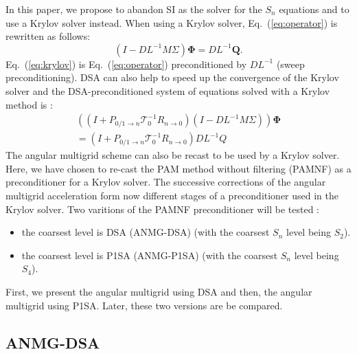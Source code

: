 \documentclass[preprint,10pt]{elsarticle}
\newcommand\bs{\boldsymbol}
\renewcommand{\(}{\left(}
\renewcommand{\)}{\right)}
\renewcommand{\[}{\left[}
\renewcommand{\]}{\right]}
\newcommand{\eqt}[1]{Eq.~(\ref{#1})}                     %
\begin{document}
In this paper, we propose to abandon SI as the solver for the $S_n$ equations 
and to use a Krylov solver instead. When using a Krylov solver, \eqt{eq:operator} is rewritten as follows:
%
\begin{equation}
(I-DL^{-1}M\Sigma) \bs{\Phi} = DL^{-1}\bs{Q} .
\label{eq:krylov}
\end{equation}
\eqt{eq:krylov} is \eqt{eq:operator}
%
preconditioned by $DL^{-1}$ (sweep preconditioning). 
DSA can also 
help to speed up the convergence of the Krylov solver and the DSA-preconditioned system of equations 
solved with a Krylov method is :
%
\begin{multline}
\((I+P_{0/1 \rightarrow n}\mathcal{T}_0^{-1} R_{n\rightarrow 0})(I-DL^{-1}M\Sigma)\)
\bs{\Phi} \\ = (I+P_{0/1 \rightarrow n}\mathcal{T}_0^{-1} R_{n\rightarrow 0})DL^{-1}Q
\end{multline}       
%
The angular multigrid scheme can also be recast to be used by a Krylov solver. Here, we have chosen
to re-cast the PAM method without filtering (PAMNF) as a preconditioner for a Krylov solver.
The successive corrections of the angular multigrid acceleration form
now different stages of a preconditioner used in the Krylov solver. Two
varitions of the PAMNF preconditioner will be tested :
\begin{itemize}
\item the coarsest level is DSA (ANMG-DSA) (with the coarsest $S_n$ level being $S_2$).
\item the coarsest level is P1SA (ANMG-P1SA) (with the coarsest $S_n$ level being $S_4$).
\end{itemize}
First, we present the angular multigrid using DSA and then, the angular
multigrid using P1SA. Later, these two versions are be compared.

\subsection{ANMG-DSA}
\end{document}
